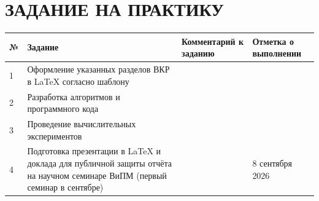 \chapter*{ЗАДАНИЕ НА ПРАКТИКУ}

\begin{center}
\begin{tabular}{|l|p{}|p{}|p{}|}
    \hline
\textbf{№} & \textbf{Задание}                                                                                                     & \textbf{Комментарий к заданию} & \textbf{Отметка о выполнении} \\\hline
1 & Оформление указанных разделов ВКР в LaTeX согласно шаблону                                                                    &                                &                               \\\hline
2 & Разработка алгоритмов и программного кода                                                                                     &                                &                               \\\hline
3 & Проведение вычислительных экспериментов                                                                                       &                                &                               \\\hline
4 & Подготовка презентации в LaTeX и доклада для публичной защиты отчёта на научном семинаре ВиПМ (первый семинар в сентябре)     &                                &   8 сентября 2026             \\\hline
\end{tabular}
\end{center}